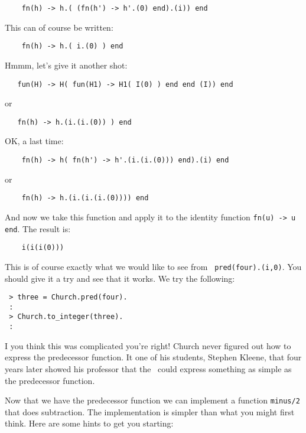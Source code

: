 \documentclass[a4paper,11pt]{article}
\begin{document}
\begin{verbatim}
    fn(h) -> h.( (fn(h') -> h'.(0) end).(i)) end 
\end{verbatim}

This can of course be written:
  
\begin{verbatim}
    fn(h) -> h.( i.(0) ) end     
\end{verbatim}
 
Hmmm, let's give it another shot:

\begin{verbatim}
   fun(H) -> H( fun(H1) -> H1( I(0) ) end end (I)) end 
\end{verbatim}
or
\begin{verbatim}  
   fn(h) -> h.(i.(i.(0)) ) end 

\end{verbatim}

OK, a last time:
\begin{verbatim}
    fn(h) -> h( fn(h') -> h'.(i.(i.(0))) end).(i) end 
\end{verbatim}
or
\begin{verbatim}  
    fn(h) -> h.(i.(i.(i.(0)))) end 
\end{verbatim}

And now we take this function and apply it to the identity function
{\tt fn(u) -> u end}. The result is:

\begin{verbatim}
    i(i(i(0)))
\end{verbatim}

This is of course exactly what we would like to see from {\tt
  pred(four).(i,0)}. You should give it a try
and see that it works. We try the following:

\begin{verbatim}
 > three = Church.pred(four).
 :
 > Church.to_integer(three).
 :
\end{verbatim}

I you think this was complicated you're right! Church never figured
out how to express the predecessor function. It one of his students,
Stephen Kleene, that four years later showed his professor that the
\lamc\ could express something as simple as the predecessor function. 

Now that we have the predecessor function we can implement a function
{\tt minus/2} that does subtraction. The implementation is simpler
than what you might first think. Here are some hints to get you starting:
\end{document}

